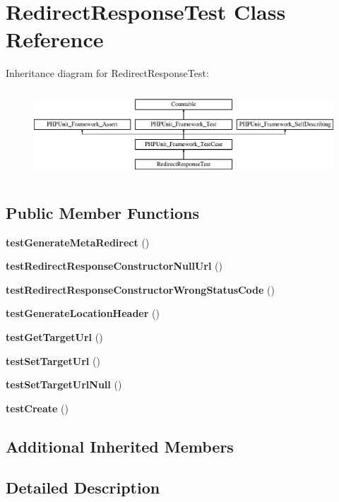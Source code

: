\section{Redirect\+Response\+Test Class Reference}
\label{class_symfony_1_1_component_1_1_http_foundation_1_1_tests_1_1_redirect_response_test}
Inheritance diagram for Redirect\+Response\+Test\+:\begin{figure}[H]
\begin{center}
\leavevmode
\includegraphics[height=3.303835cm]{class_symfony_1_1_component_1_1_http_foundation_1_1_tests_1_1_redirect_response_test}
\end{center}
\end{figure}
\subsection*{Public Member Functions}
\begin{DoxyCompactItemize}
\item 
{\bf test\+Generate\+Meta\+Redirect} ()
\item 
{\bf test\+Redirect\+Response\+Constructor\+Null\+Url} ()
\item 
{\bf test\+Redirect\+Response\+Constructor\+Wrong\+Status\+Code} ()
\item 
{\bf test\+Generate\+Location\+Header} ()
\item 
{\bf test\+Get\+Target\+Url} ()
\item 
{\bf test\+Set\+Target\+Url} ()
\item 
{\bf test\+Set\+Target\+Url\+Null} ()
\item 
{\bf test\+Create} ()
\end{DoxyCompactItemize}
\subsection*{Additional Inherited Members}


\subsection{Detailed Description}



